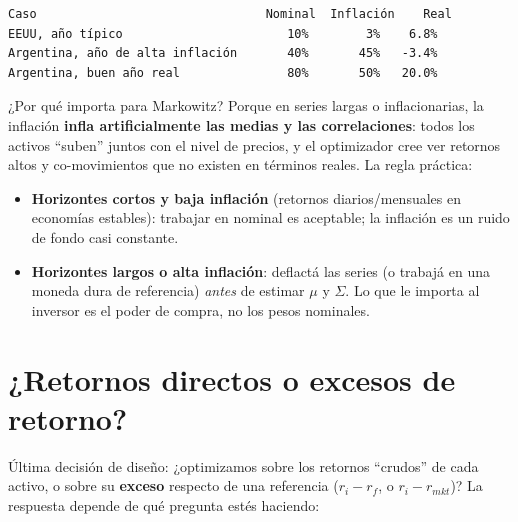 \documentclass[
  spanish,
  letterpaper,
  DIV=11,
  numbers=noendperiod]{scrreprt}
\providecommand{\tightlist}{%
  \setlength{\itemsep}{0pt}\setlength{\parskip}{0pt}}
\begin{document}
\begin{verbatim}
Caso                                Nominal  Inflación    Real
EEUU, año típico                       10%        3%    6.8%
Argentina, año de alta inflación       40%       45%   -3.4%
Argentina, buen año real               80%       50%   20.0%
\end{verbatim}

¿Por qué importa para Markowitz? Porque en series largas o
inflacionarias, la inflación \textbf{infla artificialmente las medias y
las correlaciones}: todos los activos ``suben'' juntos con el nivel de
precios, y el optimizador cree ver retornos altos y co-movimientos que
no existen en términos reales. La regla práctica:

\begin{itemize}
\tightlist
\item
  \textbf{Horizontes cortos y baja inflación} (retornos
  diarios/mensuales en economías estables): trabajar en nominal es
  aceptable; la inflación es un ruido de fondo casi constante.
\item
  \textbf{Horizontes largos o alta inflación}: deflactá las series (o
  trabajá en una moneda dura de referencia) \emph{antes} de estimar
  \(\mu\) y \(\Sigma\). Lo que le importa al inversor es el poder de
  compra, no los pesos nominales.
\end{itemize}

\section{¿Retornos directos o excesos de
retorno?}\label{retornos-directos-o-excesos-de-retorno}

Última decisión de diseño: ¿optimizamos sobre los retornos ``crudos'' de
cada activo, o sobre su \textbf{exceso} respecto de una referencia
(\(r_i - r_f\), o \(r_i - r_{mkt}\))? La respuesta depende de qué
pregunta estés haciendo:
\end{document}
